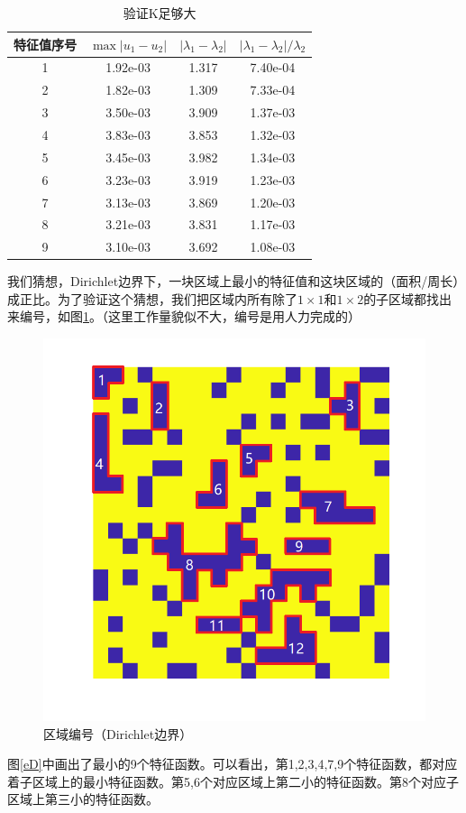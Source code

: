 \documentclass[12pt,a4paper]{article}
\begin{document}
\begin{table}
\centering
\begin{tabular}{c|c|c|c}
\hline
特征值序号 & $\max |u_1 - u_2|$ & $|\lambda_1 - \lambda_2|$ & $|\lambda_1 - \lambda_2| / \lambda_2$ \\
\hline
1 & 1.92e-03 & 1.317 & 7.40e-04 \\
2 & 1.82e-03 & 1.309 & 7.33e-04 \\
3 & 3.50e-03 & 3.909 & 1.37e-03 \\
4 & 3.83e-03 & 3.853 & 1.32e-03 \\
5 & 3.45e-03 & 3.982 & 1.34e-03 \\
6 & 3.23e-03 & 3.919 & 1.23e-03 \\
7 & 3.13e-03 & 3.869 & 1.20e-03 \\
8 & 3.21e-03 & 3.831 & 1.17e-03 \\
9 & 3.10e-03 & 3.692 & 1.08e-03 \\
\hline 
\end{tabular}
\caption{验证K足够大}
\label{kD}
\end{table}

我们猜想，Dirichlet边界下，一块区域上最小的特征值和这块区域的（面积/周长）成正比。为了验证这个猜想，我们把区域内所有除了$1\times1$和$1\times2$的子区域都找出来编号，如图\ref{rD}。（这里工作量貌似不大，编号是用人力完成的）

\begin{figure}[htbp]
\centering
\includegraphics[width=0.4\linewidth]{locate/edVD}
\caption{区域编号（Dirichlet边界）}
\label{rD}
\end{figure}

图\ref{eD}中画出了最小的9个特征函数。可以看出，第1,2,3,4,7,9个特征函数，都对应着子区域上的最小特征函数。第5,6个对应区域上第二小的特征函数。第8个对应子区域上第三小的特征函数。
\end{document}
